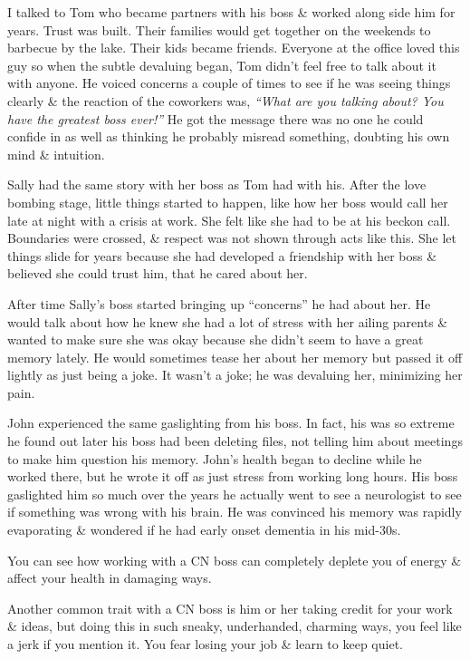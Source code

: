\documentclass{article}
\numberwithin{equation}{section}
\begin{document}
I talked to Tom who became partners with his boss \& worked along side him for years. Trust was built. Their families would get together on the weekends to barbecue by the lake. Their kids became friends. Everyone at the office loved this guy so when the subtle devaluing began, Tom didn't feel free to talk about it with anyone. He voiced concerns a couple of times to see if he was seeing things clearly \& the reaction of the coworkers was, \textit{``What are you talking about? You have the greatest boss ever!''} He got the message there was no one he could confide in as well as thinking he probably misread something, doubting his own mind \& intuition.

Sally had the same story with her boss as Tom had with his. After the love bombing stage, little things started to happen, like how her boss would call her late at night with a crisis at work. She felt like she had to be at his beckon call. Boundaries were crossed, \& respect was not shown through acts like this. She let things slide for years because she had developed a friendship with her boss \& believed she could trust him, that he cared about her.

After time Sally's boss started bringing up ``concerns'' he had about her. He would talk about how he knew she had a lot of stress with her ailing parents \& wanted to make sure she was okay because she didn't seem to have a great memory lately. He would sometimes tease her about her memory but passed it off lightly as just being a joke. It wasn't a joke; he was devaluing her, minimizing her pain.

John experienced the same gaslighting from his boss. In fact, his was so extreme he found out later his boss had been deleting files, not telling him about meetings to make him question his memory. John's health began to decline while he worked there, but he wrote it off as just stress from working long hours. His boss gaslighted him so much over the years he actually went to see a neurologist to see if something was wrong with his brain. He was convinced his memory was rapidly evaporating \& wondered if he had early onset dementia in his mid-30s.

You can see how working with a CN boss can completely deplete you of energy \& affect your health in damaging ways.

Another common trait with a CN boss is him or her taking credit for your work \& ideas, but doing this in such sneaky, underhanded, charming ways, you feel like a jerk if you mention it. You fear losing your job \& learn to keep quiet.
\end{document}
